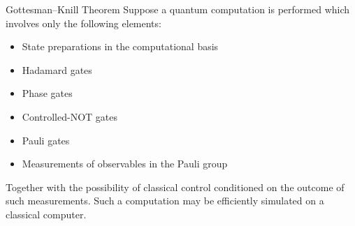 \begin{frame}{Gottesman–Knill Theorem}
    Suppose a quantum computation is performed which involves only the following elements:

    \vspace*{2mm}

    \begin{itemize}
        \setlength{\itemsep}{0.25\baselineskip}
        \item
        State preparations in the computational basis
        \item
        Hadamard gates
        \item
        Phase gates
        \item
        Controlled-NOT gates
        \item
        Pauli gates
        \item
        Measurements of observables in the Pauli group
    \end{itemize}

    \vspace*{2mm}

    Together with the possibility of classical control conditioned on the outcome of such measurements.
    Such a computation may be efficiently simulated on a classical computer.

    \vspace*{10mm}

\end{frame}